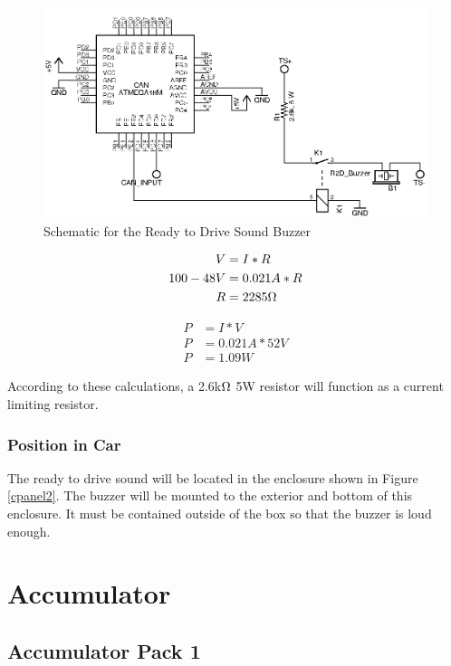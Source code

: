 \documentclass{article}
\begin{document}
                \begin{figure}[H]
                    \centering
                    \includegraphics[width = 0.7 \textwidth]{R2Dsoundbuzzerschem}
                    \caption{Schematic for the Ready to Drive Sound Buzzer}
                    \label{R2D}
                \end{figure}

            \begin{align}
                V &= I * R\\
                100-48 V &= 0.021A * R\\
                R &= 2285 \ohm
            \end{align}

            \begin{align}
                P &= I * V \\
                P &= 0.021A * 52 V \\
                P &= 1.09W
            \end{align}

            According to these calculations, a 2.6k$\ohm$ 5W resistor will function as a current limiting resistor.

        \subsubsection{Position in Car}

            The ready to drive sound will be located in the enclosure shown in Figure \ref{cpanel2}. The buzzer will be mounted to the exterior and bottom of this enclosure. It must be contained outside of the box so that the buzzer is loud enough.

\newpage

\section{Accumulator}

    \subsection{Accumulator Pack 1} \label{Battery1}
\end{document}
